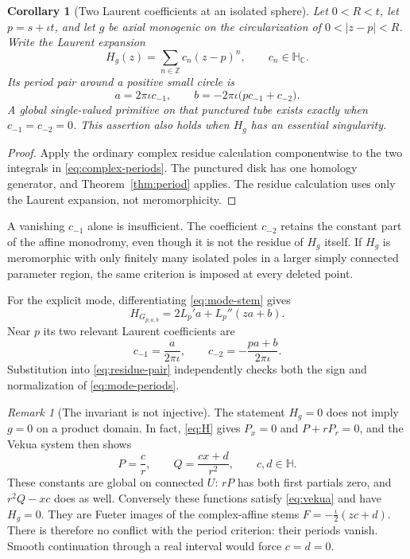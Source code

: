 \documentclass[11pt,a4paper]{article}
\numberwithin{equation}{section}
\newtheorem{corollary}[theorem]{Corollary}
\theoremstyle{definition}
\theoremstyle{remark}
\newtheorem{remark}[theorem]{Remark}
\newcommand{\C}{\mathbb C}
\newcommand{\HH}{\mathbb H}
\newcommand{\HC}{\mathbb H_{\C}}
\begin{document}
\begin{corollary}[Two Laurent coefficients at an isolated sphere]
\label{cor:two-residues}
Let $0<R<t$, let $p=s+\iota t$, and let $g$ be axial monogenic on the
circularization of $0<|z-p|<R$. Write the Laurent expansion
\begin{equation}
 H_g(z)=\sum_{n\in\mathbb Z}c_n(z-p)^n,\qquad c_n\in\HC.
 \label{eq:H-laurent}
\end{equation}
Its period pair around a positive small circle is
\begin{equation}
 a=2\pi\iota c_{-1},\qquad
 b=-2\pi\iota\bigl(p c_{-1}+c_{-2}\bigr).\label{eq:residue-pair}
\end{equation}
A global single-valued primitive on that punctured tube exists exactly
when $c_{-1}=c_{-2}=0$. This assertion also holds when $H_g$ has an
essential singularity.
\end{corollary}
\begin{proof}
Apply the ordinary complex residue calculation componentwise to the two
integrals in \eqref{eq:complex-periods}. The punctured disk has one
homology generator, and Theorem~\ref{thm:period} applies. The residue
calculation uses only the Laurent expansion, not meromorphicity.
\end{proof}
A vanishing $c_{-1}$ alone is insufficient. The coefficient $c_{-2}$
retains the constant part of the affine monodromy, even though it is not
the residue of $H_g$ itself. If $H_g$ is meromorphic with only finitely
many isolated poles in a larger simply connected parameter region, the
same criterion is imposed at every deleted point.

For the explicit mode, differentiating \eqref{eq:mode-stem} gives
\begin{equation}
 H_{G_{p;a,b}}=2L_p'a+L_p''(za+b).\label{eq:H-mode}
\end{equation}
Near $p$ its two relevant Laurent coefficients are
\begin{equation}
 c_{-1}=\frac{a}{2\pi\iota},\qquad
 c_{-2}=-\frac{pa+b}{2\pi\iota}.\label{eq:mode-residues}
\end{equation}
Substitution into \eqref{eq:residue-pair} independently checks both the
sign and normalization of \eqref{eq:mode-periods}.

\begin{remark}[The invariant is not injective]\label{rem:H-kernel}
The statement $H_g=0$ does not imply $g=0$ on a product domain.
In fact, \eqref{eq:H} gives $P_x=0$ and $P+rP_r=0$, and the Vekua
system then shows
\begin{equation}
 P=\frac c r,\qquad Q=\frac{cx+d}{r^2},\qquad c,d\in\HH.
 \label{eq:H-kernel}
\end{equation}
These constants are global on connected $U$: $rP$ has both first
partials zero, and $r^2Q-xc$ does as well. Conversely these functions
satisfy \eqref{eq:vekua} and have $H_g=0$.
They are Fueter images of the complex-affine stems
$F=-\tfrac{\iota}{2}(zc+d)$. There is therefore no conflict with the
period criterion: their periods vanish. Smooth continuation through a
real interval would force $c=d=0$.
\end{remark}
\end{document}
